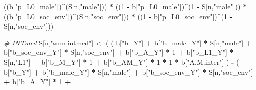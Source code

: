 \documentclass[
]{book}
\newenvironment{Shaded}{\begin{snugshade}}{\end{snugshade}}
\newcommand{\CommentTok}[1]{\textcolor[rgb]{0.56,0.35,0.01}{\textit{#1}}}
\newcommand{\DecValTok}[1]{\textcolor[rgb]{0.00,0.00,0.81}{#1}}
\newcommand{\NormalTok}[1]{#1}
\newcommand{\OtherTok}[1]{\textcolor[rgb]{0.56,0.35,0.01}{#1}}
\newcommand{\SpecialCharTok}[1]{\textcolor[rgb]{0.81,0.36,0.00}{\textbf{#1}}}
\newcommand{\StringTok}[1]{\textcolor[rgb]{0.31,0.60,0.02}{#1}}
\begin{document}
\begin{Shaded}
\begin{Highlighting}[]
\NormalTok{      ((b[}\StringTok{"p\_L0\_male"}\NormalTok{])}\SpecialCharTok{\^{}}\NormalTok{(S[n,}\StringTok{"male"}\NormalTok{])) }\SpecialCharTok{*} 
\NormalTok{      ((}\DecValTok{1} \SpecialCharTok{{-}}\NormalTok{ b[}\StringTok{"p\_L0\_male"}\NormalTok{])}\SpecialCharTok{\^{}}\NormalTok{(}\DecValTok{1} \SpecialCharTok{{-}}\NormalTok{ S[n,}\StringTok{"male"}\NormalTok{])) }\SpecialCharTok{*} 
\NormalTok{      ((b[}\StringTok{"p\_L0\_soc\_env"}\NormalTok{])}\SpecialCharTok{\^{}}\NormalTok{(S[n,}\StringTok{"soc\_env"}\NormalTok{])) }\SpecialCharTok{*}
\NormalTok{      ((}\DecValTok{1} \SpecialCharTok{{-}}\NormalTok{ b[}\StringTok{"p\_L0\_soc\_env"}\NormalTok{])}\SpecialCharTok{\^{}}\NormalTok{(}\DecValTok{1} \SpecialCharTok{{-}}\NormalTok{ S[n,}\StringTok{"soc\_env"}\NormalTok{]))}
    
    \CommentTok{\# INTmed }
\NormalTok{    S[n,}\StringTok{"sum.intmed"}\NormalTok{] }\OtherTok{\textless{}{-}}\NormalTok{ ( ( b[}\StringTok{"b\_Y"}\NormalTok{] }\SpecialCharTok{+} 
\NormalTok{                               b[}\StringTok{"b\_male\_Y"}\NormalTok{] }\SpecialCharTok{*}\NormalTok{ S[n,}\StringTok{"male"}\NormalTok{] }\SpecialCharTok{+} 
\NormalTok{                               b[}\StringTok{"b\_soc\_env\_Y"}\NormalTok{] }\SpecialCharTok{*}\NormalTok{ S[n,}\StringTok{"soc\_env"}\NormalTok{] }\SpecialCharTok{+} 
\NormalTok{                               b[}\StringTok{"b\_A\_Y"}\NormalTok{] }\SpecialCharTok{*} \DecValTok{1} \SpecialCharTok{+} 
\NormalTok{                               b[}\StringTok{"b\_L1\_Y"}\NormalTok{] }\SpecialCharTok{*}\NormalTok{ S[n,}\StringTok{"L1"}\NormalTok{] }\SpecialCharTok{+}
\NormalTok{                               b[}\StringTok{"b\_M\_Y"}\NormalTok{] }\SpecialCharTok{*} \DecValTok{1} \SpecialCharTok{+}
\NormalTok{                               b[}\StringTok{"b\_AM\_Y"}\NormalTok{] }\SpecialCharTok{*} \DecValTok{1} \SpecialCharTok{*} \DecValTok{1} \SpecialCharTok{*}\NormalTok{ b[}\StringTok{"A.M.inter"}\NormalTok{] ) }\SpecialCharTok{{-}} 
\NormalTok{                             ( b[}\StringTok{"b\_Y"}\NormalTok{] }\SpecialCharTok{+} 
\NormalTok{                                 b[}\StringTok{"b\_male\_Y"}\NormalTok{] }\SpecialCharTok{*}\NormalTok{ S[n,}\StringTok{"male"}\NormalTok{] }\SpecialCharTok{+} 
\NormalTok{                                 b[}\StringTok{"b\_soc\_env\_Y"}\NormalTok{] }\SpecialCharTok{*}\NormalTok{ S[n,}\StringTok{"soc\_env"}\NormalTok{] }\SpecialCharTok{+} 
\NormalTok{                                 b[}\StringTok{"b\_A\_Y"}\NormalTok{] }\SpecialCharTok{*} \DecValTok{1} \SpecialCharTok{+} 

\end{Highlighting}
\end{Shaded}
\end{document}
